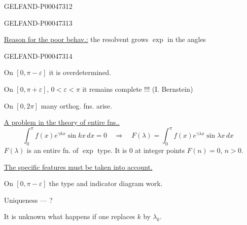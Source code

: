 \begin{GelfandAdjacentEvidence}{GELFAND-P000473}{12}


\end{GelfandAdjacentEvidence}
\begin{GelfandAdjacentEvidence}{GELFAND-P000473}{13}

\uline{Reason for the poor behav.:} the resolvent grows $\exp$ in the angles
\end{GelfandAdjacentEvidence}
\begin{GelfandAdjacentEvidence}{GELFAND-P000473}{14}


On $[0,\pi-\varepsilon]$ it is overdetermined.

On $[0,\pi+\varepsilon]$, $0<\varepsilon<\pi$ it remains complete !!! (I. Bernstein)
\end{GelfandAdjacentEvidence}


On $[0,2\pi]$ many orthog. fns. arise.

\uline{A problem in the theory of entire fns..}
\[
\int_0^\pi f(x)e^{\gamma kx}\sin kx\,dx=0
\quad\Longrightarrow\quad
F(\lambda)=\int_0^\pi f(x)e^{\gamma\lambda x}\sin\lambda x\,dx
\]
$F(\lambda)$ is an entire fn. of $\exp$ type. It is 0 at integer points
$F(n)=0$, $n>0$.

\uline{The specific features must be taken into account.}

On $[0,\pi-\varepsilon]$ the type and indicator diagram work.

Uniqueness — ?

It is unknown what happens if one replaces $k$ by $\lambda_k$.



